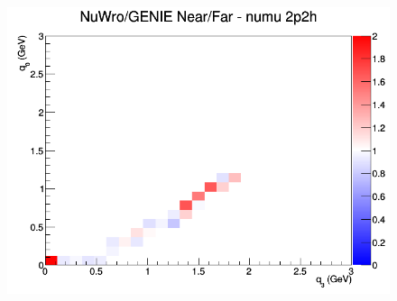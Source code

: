 \documentclass[12pt]{article}
\begin{document}
\begin{figure}[h]
\endminipage
{}
\includegraphics[width=\linewidth]{q0_q3/nominal/ratios/2p2h_NuWro_GENIE_numu_NF_q3_q0.png}
\endminipage
\newline
\end{figure}
\clearpage
\end{document}
